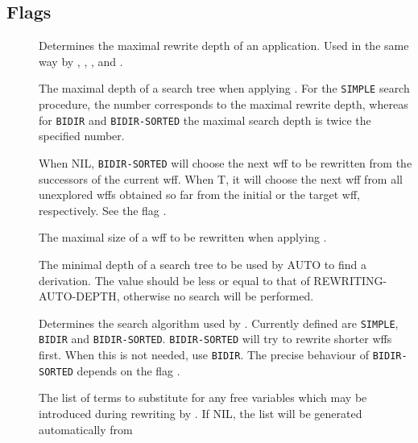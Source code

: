 \subsection{Flags} \label{RewritingTopLevelFlags}
\begin{description}
\item[]  Determines the maximal rewrite depth of
  an  application. Used in the same way by
  , , ,
   and .
\item[]  The maximal depth of a search tree
  when applying . For the \texttt{SIMPLE} search procedure,
  the number corresponds to the maximal rewrite depth, whereas for
  \texttt{BIDIR} and \linebreak \texttt{BIDIR-SORTED} the maximal search depth is
  twice the specified number.
\item[]  When NIL, \texttt{BIDIR-SORTED}
  will choose the next wff to be rewritten from the successors of the current
  wff. When T, it will choose the next wff from all unexplored wffs obtained
  so far from the initial or the target wff, respectively. See the flag
  .
\item[]  The maximal size of a wff to be
  rewritten when applying .
\item[]  The minimal depth of a search tree
  to be used by AUTO to find a derivation. The value should be less or equal to
  that of REWRITING-AUTO-DEPTH, otherwise no search will be performed.
\item[]  Determines the search algorithm
  used by . Currently defined are \texttt{SIMPLE},
  \texttt{BIDIR} and \texttt{BIDIR-SORTED}. \texttt{BIDIR-SORTED} will try to
  rewrite shorter wffs first. When this is not needed, use \texttt{BIDIR}. The
  precise behaviour of \texttt{BIDIR-SORTED} depends on the flag
  .
\item[]  The list of terms to substitute for
  any free variables which may be introduced during rewriting by
  . If NIL, the list will be generated automatically from

\end{description}
